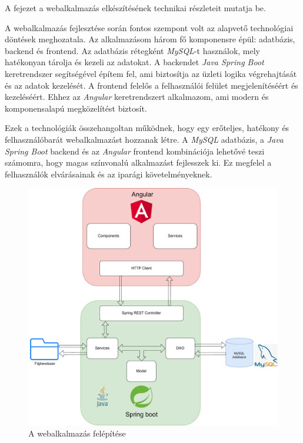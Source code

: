 
A fejezet a webalkalmazás elkészítésének technikai részleteit mutatja be.



A webalkalmazás fejlesztése során fontos szempont volt az alapvető technológiai döntések meghozatala. Az alkalmazásom három fő komponensre épül: adatbázis, backend és frontend. Az adatbázis rétegként \textit{MySQL}-t \cite{MySQL} használok, mely hatékonyan tárolja és kezeli az adatokat. A backendet \textit{Java Spring Boot} \cite{spring_boot} keretrendszer segítségével építem fel, ami biztosítja az üzleti logika végrehajtását és az adatok kezelését. A frontend felelős a felhasználói felület megjelenítéséért és kezeléséért. Ehhez az \textit{Angular} \cite{angular} keretrendszert alkalmazom, ami modern és komponensalapú megközelítést biztosít.

Ezek a technológiák összehangoltan működnek, hogy egy erőteljes, hatékony és felhasználóbarát webalkalmazást hozzanak létre. A \textit{MySQL} \cite{MySQL} adatbázis, a \textit{Java Spring Boot} \cite{spring_boot} backend és az \textit{Angular} \cite{angular} frontend kombinációja lehetővé teszi számomra, hogy magas színvonalú alkalmazást fejlesszek ki. Ez megfelel a felhasználók elvárásainak és az iparági követelményeknek.

\begin{figure}[h]
\centering
\includegraphics[width=\textwidth]{images/A_webalkalmazás_felépítése.pdf}
\caption{A webalkalmazás felépítése}
\label{fig:felepites}
\end{figure}


